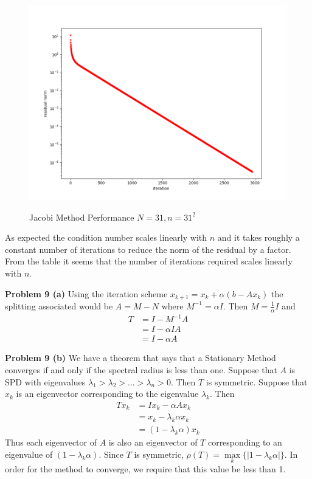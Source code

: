 \documentclass[12pt]{article}
\newcommand{\problem}[1]{\hspace{-4 ex} \large \textbf{Problem #1} }
\begin{document}
\begin{figure}[H]
	\caption{Jacobi Method Performance $N=31, n=31^2$}
	\includegraphics[width=1\textwidth]{hwch7_figure_2}
	\label{5c2}
	\centering
\end{figure}

As expected the condition number scales linearly with $n$ and it takes roughly a constant number of iterations to reduce the norm of the residual by a factor. From the table it seems that the number of iterations required scales linearly with $n$. 

\bigbreak

\problem{9 (a)} Using the iteration scheme $x_{k+1} = x_k + \alpha(b-Ax_k)$ the splitting associated would be $A= M-N$ where $M^{-1} = \alpha I$. Then $M = \frac{1}{\alpha}I$ and
\begin{align*}
	T & = I - M^{-1}A \\
	& = I - \alpha I A \\
	& = I - \alpha A
\end{align*}

\bigbreak

\problem{9 (b)} We have a theorem that says that a Stationary Method converges if and only if the spectral radius is less than one. Suppose that $A$ is SPD with eigenvalues $\lambda_1 > \lambda_2 > ... > \lambda_n > 0$. Then $T$ is symmetric. Suppose that $x_k$ is an eigenvector corresponding to the eigenvalue $\lambda_k$. Then
\begin{align*}
	Tx_k & = Ix_k - \alpha Ax_k \\
	& = x_k - \lambda_k \alpha x_k \\
	& = \left(1- \lambda_k \alpha \right)x_k
\end{align*}
Thus each eigenvector of $A$ is also an eigenvector of $T$ corresponding to an eigenvalue of $\left( 1- \lambda_k \alpha \right)$. Since $T$ is symmetric, $\rho(T) = \max\limits_k \{ \left\vert 1 - \lambda_k \alpha \right \vert \}$. In order for the method to converge, we require that this value be less than 1. \bigbreak
\end{document}

